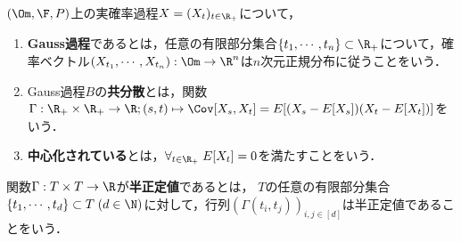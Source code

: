\documentclass[uplatex,dvipdfmx]{jsreport}
\begin{document}
\begin{definition}
    $(\Om,\F,P)$上の実確率過程$X=(X_t)_{t\in\R_+}$について，
    \begin{enumerate}
        \item \textbf{Gauss過程}であるとは，任意の有限部分集合$\{t_1,\cdots,t_n\}\subset \R_+$について，確率ベクトル$(X_{t_1},\cdots,X_{t_n}):\Om\to\R^n$は$n$次元正規分布に従うことをいう．
        \item Gauss過程$B$の\textbf{共分散}とは，関数$\Gamma:\R_+\times\R_+\to\R;(s,t)\mapsto\Cov[X_s,X_t]=E[(X_s-E[X_s])(X_t-E[X_t])]$をいう．
        \item \textbf{中心化されている}とは，$\forall_{t\in\R_+}\;E[X_t]=0$を満たすことをいう．
    \end{enumerate}
\end{definition}

\begin{definition}
    関数$\Gamma:T\times T\to\R$が\textbf{半正定値}であるとは，
    $T$の任意の有限部分集合$\{t_1,\cdots,t_d\}\subset T\;(d\in\N)$に対して，行列$(\Gamma(t_i,t_j))_{i,j\in[d]}$は半正定値であることをいう．
\end{definition}
\end{document}
